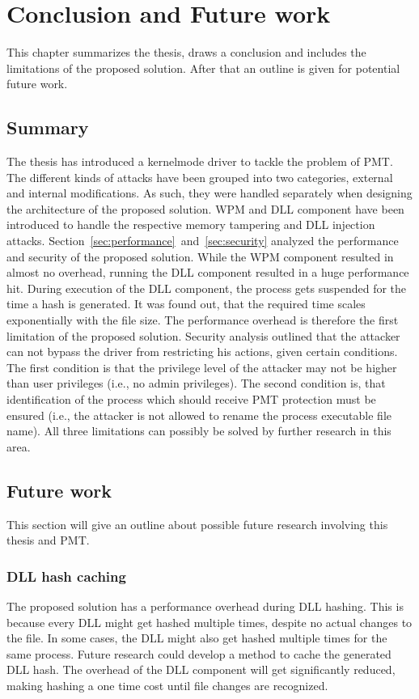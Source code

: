 \section{Conclusion and Future work}
\label{sec:futurework}
This chapter summarizes the thesis, draws a conclusion and includes the limitations of the proposed solution. After that an outline is given for potential future work.
\subsection{Summary}
The thesis has introduced a kernelmode driver to tackle the problem of \gls{PMT}. The different kinds of attacks have been grouped into two categories, external and internal modifications. As such, they were handled separately when designing the architecture of the proposed solution. \gls{WPM} and \gls{DLL} component have been introduced to handle the respective memory tampering and \gls{DLL} injection attacks. Section~\ref{sec:performance}~and~\ref{sec:security} analyzed the performance and security of the proposed solution. While the \gls{WPM} component resulted in almost no overhead, running the \gls{DLL} component resulted in a huge performance hit. During execution of the \gls{DLL} component, the process gets suspended for the time a hash is generated. It was found out, that the required time scales exponentially with the file size. The performance overhead is therefore the first limitation of the proposed solution. Security analysis outlined that the attacker can not bypass the driver from restricting his actions, given certain conditions. The first condition is that the privilege level of the attacker may not be higher than user privileges (i.e., no admin privileges). The second condition is, that identification of the process which should receive \gls{PMT} protection must be ensured (i.e., the attacker is not allowed to rename the process executable file name). All three limitations can possibly be solved by further research in this area.
\subsection{Future work}
This section will give an outline about possible future research involving this thesis and \gls{PMT}.
\subsubsection{DLL hash caching}
The proposed solution has a performance overhead during \gls{DLL} hashing. This is because every \gls{DLL} might get hashed multiple times, despite no actual changes to the file. In some cases, the \gls{DLL} might also get hashed multiple times for the same process. Future research could develop a method to cache the generated \gls{DLL} hash. The overhead of the \gls{DLL} component will get significantly reduced, making hashing a one time cost until file changes are recognized. 

